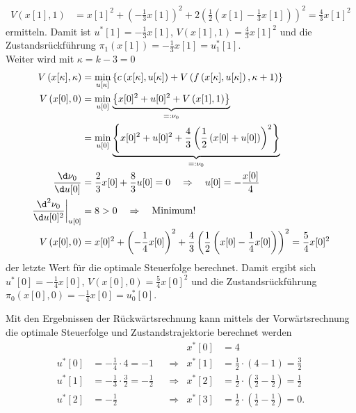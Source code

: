 \begin{exmp}
\begin{enumerate}[label=(S\arabic*)]
\begin{align*}
  	V\left(x[1], 1 \right) & = x[1]^2 + \left(-\frac13x[1]\right)^2 + 2\left(\frac12\left(x[1] -\frac13x[1] \right)\right)^2=\frac43x[1]^2
  \end{align*}  
  ermitteln. Damit ist $u^{\ast}[1]=-\frac13x[1]$, $V\left(x[1],1\right)=\frac43x[1]^2$ und die Zustandsrückführung
  $\pi_1\left(x[1]\right)=-\frac13x[1]=u^{\ast}_1[1]$.\\
  Weiter wird mit $\kappa=k-3=0$
  \begin{align*}
  	V\left(x[\kappa],\kappa\right) & = \min\limits_{u[\kappa]}\left\{c\left(x[\kappa],u[\kappa]\right)+V\left(f\left(x[\kappa],u[\kappa]
  	\right),\kappa+1 \right) \right\}\\ 
  	V\left(x[0], 0 \right) & = \min\limits_{u[0]}\underbrace{\left\{x[0]^2+u[0]^2 + V\left(x[1], 1 \right) \right\}
  	}_{=:\nu_0}\\
  	& = \min\limits_{u[0]}\underbrace{\left\{x[0]^2+u[0]^2 + \frac43\left(\frac12\left(x[0]+u[0] \right) \right)^2 \right\}
  	}_{=:\nu_0}\\
  	\frac{\d \nu_0}{\d u[0]} & = \frac23x[0]+\frac83u[0]=0\quad \Rightarrow\quad u[0]=-\frac{x[0]}{4}\\
  	\left.\frac{\d^2 \nu_0}{\d u[0]^2}\right|_{u[0]} & = 8 > 0 \quad \Rightarrow\quad\text{Minimum!}\\
  	V\left(x[0], 0 \right) & = x[0]^2 + \left(-\frac14x[0]\right)^2 + \frac43\left(\frac12\left(x[0] -\frac14x[0] \right)\right)^2=\frac54x[0]^2  
  \end{align*}
  der letzte Wert für die optimale Steuerfolge berechnet. Damit ergibt sich $u^{\ast}[0]=-\frac14x[0]$, $V\left(x[0],0\right)=\frac54x[0]^2$ und die
  Zustandsrückführung $\pi_0\left(x[0],0 \right)=-\frac14x[0]=u^{\ast}_0[0]$.
\end{enumerate}
Mit den Ergebnissen der Rückwärtsrechnung kann mittels der Vorwärtsrechnung die optimale Steuerfolge und
Zustandstrajektorie berechnet werden
\begin{align*}
& && & x^{\ast}[0] & = 4\\
u^{\ast}[0] & = -\frac14\cdot 4 = -1 && \Rightarrow  &x^{\ast}[1]& = \frac12\cdot(4-1)=\frac32\\
u^{\ast}[1] & = -\frac13\cdot\frac32=-\frac12 && \Rightarrow  &x^{\ast}[2]& = \frac12\cdot\left(\frac32 -\frac12\right)=\frac12\\
u^{\ast}[2] & = -\frac12 && \Rightarrow  &x^{\ast}[3]& = \frac12\cdot\left(\frac12 - \frac12\right)=0.
\end{align*}
\end{exmp}
